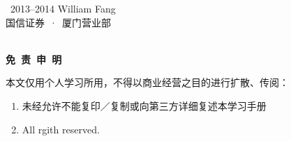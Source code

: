 \thispagestyle{empty}

\noindent\textcopyright\ 2013--2014 William Fang\\
{\kai 国信证券\ ·\ 厦门营业部} {\lmr\textregistered}\\[-2em]
\ \\

\begin{center}
\LARGE\enspace\bfseries{\color{themecolor} 免\ 责\ 申\ 明} \\
\base{}
\end{center}



本文仅用个人学习所用，不得以商业经营之目的进行扩散、传阅：

\begin{enumerate}
\item 未经允许不能复印／复制或向第三方详细复述本学习手册
\item All rgith reserved.
\end{enumerate}

